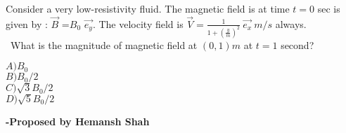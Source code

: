 \documentclass[11pt,a4paper]{scrartcl}
\begin{document}
\vspace{1cm}%
\begin{problem}

Consider a very low-resistivity fluid. The magnetic field is at time $t=0$ sec is given by : $\vec{B}$
=$B_0$ $\vec{e_y}$. The velocity field is $\vec{V}= \frac{1}{1+\left(\frac{y}{m}\right)^2} \ \vec{e_x}\  m/s$ always.\\\
What is the magnitude of magnetic field at $(0,1)m$ at $t=1$ second?

$A) B_0 $\\
$B) B_0 /2$\\
$C) \sqrt{3} B_0/2$\\
$D) \sqrt{5} B_0/2$


\end{problem}
\begin{flushright}
\textbf{\Large{-Proposed by Hemansh Shah}}
\end{flushright}
\end{document}
